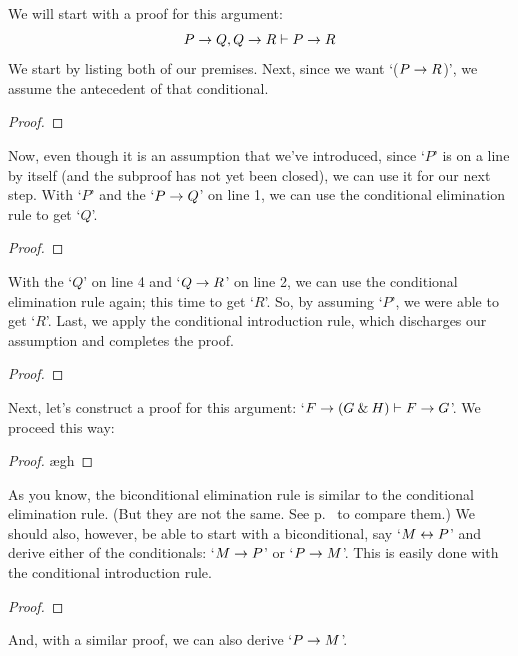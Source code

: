 \begin{earg}
\item We will start with a proof for this argument:
	$$P \rightarrow Q, Q \rightarrow R \vdash P \rightarrow R$$
We start by listing both of our premises. Next, since we want `($P \rightarrow R$)', we assume the antecedent of that conditional. 
\begin{proof}
	 \pr{}
	 \pr{}
	\open
		 \as{}
	\close
\end{proof}
Now, even though it is an assumption that we've introduced, since `$P$' is on a line by itself (and the subproof has not yet been closed), we can use it for our next step. With `$P$' and the `$P \rightarrow Q$' on line 1, we can use the conditional elimination rule to get `$Q$'. 
\begin{proof}
	 \pr{}
	 \pr{}
	\open
		\as{}
	\close
\end{proof}
With the `$Q$' on line 4 and `$Q \rightarrow R$' on line 2, we can use the conditional elimination rule again; this time to get `$R$'. So, by assuming `$P$', we were able to get `$R$'. Last, we apply the conditional introduction rule, which discharges our assumption and completes the proof.
\label{HSproof}
\begin{proof}
	 \pr{}
	 \pr{}
	\open
		\as{}
	\close
\end{proof}
\bigskip

\item Next, let's construct a proof for this argument: `$F \rightarrow (G \mathbin{\&} H) \vdash F \rightarrow G$'. We proceed this way:

\begin{proof}
	 \pr{}
	\open
		\as{}
		\ae{gh}
	\close
\end{proof}
\bigskip

\item As you know, the biconditional elimination rule is similar to the conditional elimination rule. (But they are not the same. See p.~\pageref{ce-rule} to compare them.) We should also, however, be able to start with a biconditional, say `$M \leftrightarrow P$' and derive either of the conditionals: `$M \rightarrow P$' or `$P \rightarrow M$'. This is easily done with the conditional introduction rule.
\begin{proof}
	 \pr{}
	\open
		\as{}
	\close
\end{proof}
\smallskip
\noindent And, with a similar proof, we can also derive `$P \rightarrow M$'.
\bigskip


\end{earg}
